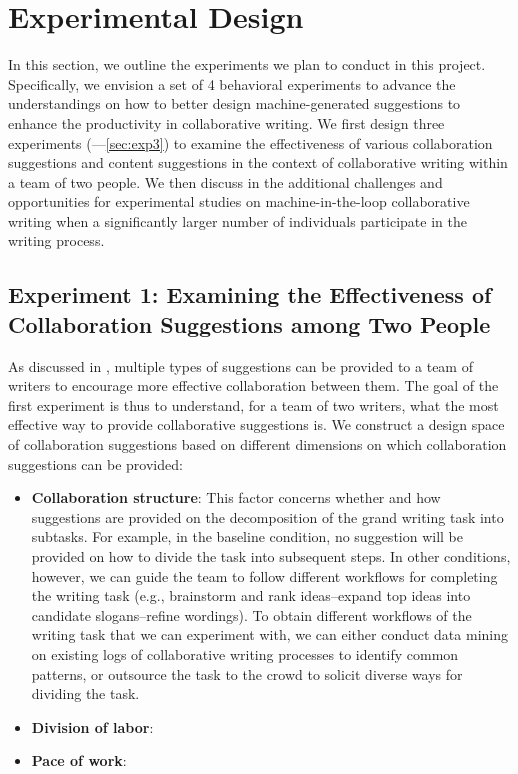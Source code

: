 
\section{Experimental Design}

In this section, we outline the experiments we plan to conduct in this project. Specifically, we envision a set of 4 behavioral experiments to advance the understandings on how to better design machine-generated suggestions to enhance the productivity in collaborative writing. We first design three experiments (---\ref{sec:exp3}) to examine the effectiveness of various collaboration suggestions and content suggestions in the context of collaborative writing within a team of two people. We then discuss in  the additional challenges and opportunities for experimental studies on machine-in-the-loop collaborative writing when a significantly larger number of individuals participate in the writing process.

\subsection{Experiment 1: Examining the Effectiveness of Collaboration Suggestions among Two People}
\label{sec:exp1}

As discussed in , multiple types of suggestions can be provided to a team of writers to encourage more effective collaboration between them. The goal of the first experiment is thus to understand, for a team of two writers, what the most effective way to provide collaborative suggestions is. We construct a design space of collaboration suggestions based on different dimensions on which collaboration suggestions can be provided:
\begin{itemize}
\item {\bf Collaboration structure}: This factor concerns whether and how suggestions are provided on the decomposition of the grand writing task into subtasks. For example, in the baseline condition, no suggestion will be provided on how to divide the task into subsequent steps. In other conditions, however, we can guide the team to follow different workflows for completing the writing task (e.g., brainstorm and rank ideas--expand top ideas into candidate slogans--refine wordings). To obtain different workflows of the writing task that we can experiment with, we can either conduct data mining on existing logs of collaborative writing processes to identify common patterns, or outsource the task to the crowd to solicit diverse ways for dividing the task.  
\item {\bf Division of labor}:
\item {\bf Pace of work}:
\end{itemize}

